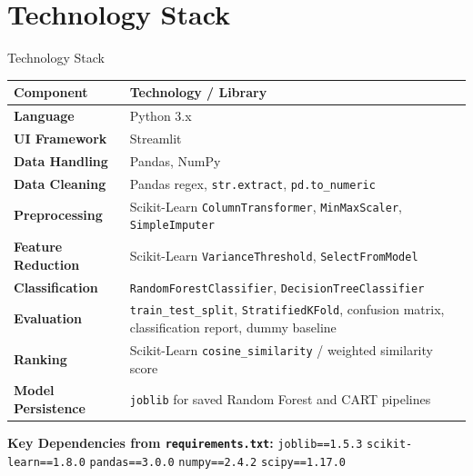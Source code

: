 \documentclass[aspectratio=169]{beamer}
\begin{document}
\section{Technology Stack}
\begin{frame}{Technology Stack}
  \begin{center}
    \renewcommand{\arraystretch}{0.75}
    \begin{tabularx}{1.5\textwidth}{>{\bfseries}lX}
      \toprule
      \textbf{Component}      & \textbf{Technology / Library} \\
      \midrule
      Language                & Python 3.x \\
      UI Framework            & Streamlit \\
      Data Handling           & Pandas, NumPy \\
      Data Cleaning           & Pandas regex, \texttt{str.extract}, \texttt{pd.to\_numeric} \\
      Preprocessing           & Scikit-Learn \texttt{ColumnTransformer}, \texttt{MinMaxScaler}, \texttt{SimpleImputer} \\
      Feature Reduction       & Scikit-Learn \texttt{VarianceThreshold}, \texttt{SelectFromModel} \\
      Classification          & \texttt{RandomForestClassifier}, \texttt{DecisionTreeClassifier} \\
      Evaluation              & \texttt{train\_test\_split}, \texttt{StratifiedKFold}, confusion matrix, classification report, dummy baseline \\
      Ranking                 & Scikit-Learn \texttt{cosine\_similarity} / weighted similarity score \\
      Model Persistence       & \texttt{joblib} for saved Random Forest and CART pipelines \\
      \bottomrule
    \end{tabularx}
  \end{center}
  \vspace{0.3em}
  \small\textbf{Key Dependencies from \texttt{requirements.txt}:}
  \texttt{joblib==1.5.3} \quad \texttt{scikit-learn==1.8.0} \quad \texttt{pandas==3.0.0} \quad
  \texttt{numpy==2.4.2} \quad \texttt{scipy==1.17.0}
\end{frame}

\end{document}
